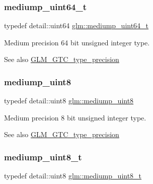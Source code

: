 \subsubsection{\texorpdfstring{mediump\+\_\+uint64\+\_\+t}{mediump\_uint64\_t}}
{\footnotesize\ttfamily typedef detail\+::uint64 \hyperlink{group__gtc__type__precision_gaa97354d3120a6dc029a5e9563723de18}{glm\+::mediump\+\_\+uint64\+\_\+t}}

Medium precision 64 bit unsigned integer type. \begin{DoxySeeAlso}{See also}
\hyperlink{group__gtc__type__precision}{G\+L\+M\+\_\+\+G\+T\+C\+\_\+type\+\_\+precision} 
\end{DoxySeeAlso}
\mbox{\label{group__gtc__type__precision_gac4b849eaac0543a10f97f4bdda4850a8}} 
\subsubsection{\texorpdfstring{mediump\+\_\+uint8}{mediump\_uint8}}
{\footnotesize\ttfamily typedef detail\+::uint8 \hyperlink{group__gtc__type__precision_gac4b849eaac0543a10f97f4bdda4850a8}{glm\+::mediump\+\_\+uint8}}

Medium precision 8 bit unsigned integer type. \begin{DoxySeeAlso}{See also}
\hyperlink{group__gtc__type__precision}{G\+L\+M\+\_\+\+G\+T\+C\+\_\+type\+\_\+precision} 
\end{DoxySeeAlso}
\mbox{\label{group__gtc__type__precision_gadfa38f3c245d371c4b2079f1fd68928b}} 
\subsubsection{\texorpdfstring{mediump\+\_\+uint8\+\_\+t}{mediump\_uint8\_t}}
{\footnotesize\ttfamily typedef detail\+::uint8 \hyperlink{group__gtc__type__precision_gadfa38f3c245d371c4b2079f1fd68928b}{glm\+::mediump\+\_\+uint8\+\_\+t}}

